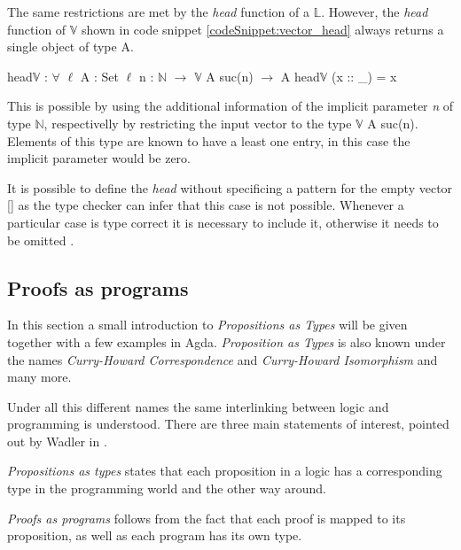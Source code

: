 The same restrictions are met by the \emph{head} function of a $\mathbb{L}$. 
However, the \emph{head} function of $\mathbb{V}$ shown in code snippet \ref{codeSnippet:vector_head} always returns a single object of type A.

\begin{codesnippet}[mathescape=true, caption={Definition of $head\mathbb{V}$ function in Agda}, label={codeSnippet:vector_head}]
head$\mathbb{V}$ : $\forall$ {$\ell$} {A : Set $\ell$} {n : $\mathbb{N}$} $\rightarrow$ 
        $\mathbb{V}$ A suc(n) $\rightarrow$ A
head$\mathbb{V}$ (x :: _) = x
\end{codesnippet}

This is possible by using the additional information of the implicit parameter \emph{n} of type $\mathbb{N}$, respectivelly by restricting the input vector to the type $\mathbb{V}$ A suc(n).
Elements of this type are known to have a least one entry, in this case the implicit parameter would be zero.

It is possible to define the \emph{head} without specificing a pattern for the empty vector [] as the type checker can infer that this case is not possible.
Whenever a particular case is type correct it is necessary to include it, otherwise it needs to be omitted \cite{norell:deptyped}.

\subsection{Proofs as programs}\label{section:agda_proofs}
In this section a small introduction to \emph{Propositions as Types}\cite{10.1145/2699407} will be given together with a few examples in Agda. \emph{Proposition as Types} is also known under the names \emph{Curry-Howard Correspondence}\cite{10.5555/1076265} and \emph{Curry-Howard Isomorphism}\cite{10.1145/2841316} and many more.

Under all this different names the same interlinking between logic and programming is understood. There are three main statements of interest, pointed out by Wadler in \cite{10.1145/2699407}.

\emph{Propositions as types} states that each proposition in a logic has a corresponding type in the programming world and the other way around. 

\emph{Proofs as programs} follows from the fact that each proof is mapped to its proposition, as well as each program has its own type.

